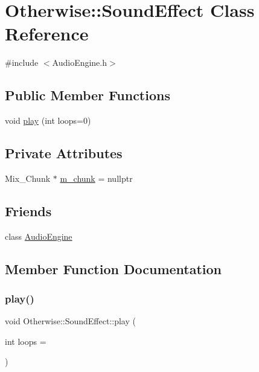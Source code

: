 \hypertarget{class_otherwise_1_1_sound_effect}{}\section{Otherwise\+:\+:Sound\+Effect Class Reference}
\label{class_otherwise_1_1_sound_effect}


{\ttfamily \#include $<$Audio\+Engine.\+h$>$}

\subsection*{Public Member Functions}
\begin{DoxyCompactItemize}
\item 
void \hyperlink{class_otherwise_1_1_sound_effect_a1bb92b883022e0334ffec718de5bde65}{play} (int loops=0)
\end{DoxyCompactItemize}
\subsection*{Private Attributes}
\begin{DoxyCompactItemize}
\item 
Mix\+\_\+\+Chunk $\ast$ \hyperlink{class_otherwise_1_1_sound_effect_a457a25ed12d7e211421cb40aa91a07a5}{m\+\_\+chunk} = nullptr
\end{DoxyCompactItemize}
\subsection*{Friends}
\begin{DoxyCompactItemize}
\item 
class \hyperlink{class_otherwise_1_1_sound_effect_a234a96133b0b1dbaf4181626861f7c4a}{Audio\+Engine}
\end{DoxyCompactItemize}


\subsection{Member Function Documentation}
\mbox{\label{class_otherwise_1_1_sound_effect_a1bb92b883022e0334ffec718de5bde65}} 
\subsubsection{\texorpdfstring{play()}{play()}}
{\footnotesize\ttfamily void Otherwise\+::\+Sound\+Effect\+::play (\begin{DoxyParamCaption}\item[{int}]{loops = {} }\end{DoxyParamCaption})}

